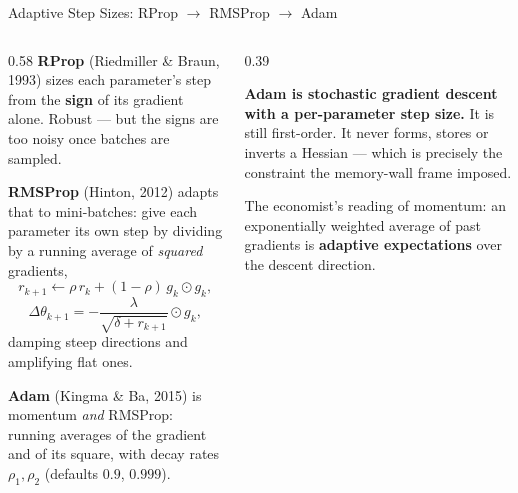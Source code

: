 \begin{frame}{Adaptive Step Sizes: RProp $\to$ RMSProp $\to$ Adam}
\begin{columns}[T]
\begin{column}{0.58\textwidth}
\small
\textbf{RProp} (Riedmiller \& Braun, 1993) sizes each parameter's step from the \textbf{sign} of its gradient alone. Robust --- but the signs are too noisy once batches are sampled.
\medskip

\textbf{RMSProp} (Hinton, 2012) adapts that to mini-batches: give each parameter its own step by dividing by a running average of \emph{squared} gradients,
\[
  r_{k+1}\leftarrow\rho\,r_k+(1-\rho)\,g_k\odot g_k,
\]
\[
  \Delta\theta_{k+1}=-\frac{\lambda}{\sqrt{\delta+r_{k+1}}}\odot g_k ,
\]
damping steep directions and amplifying flat ones.
\medskip

\textbf{Adam} (Kingma \& Ba, 2015) is momentum \emph{and} RMSProp: running averages of the gradient and of its square, with decay rates $\rho_1,\rho_2$ (defaults $0.9$, $0.999$).
\end{column}
\begin{column}{0.39\textwidth}
\begin{takeawaybox}[title=\textbf{What Adam is, in one line}]\small
\textbf{Adam is stochastic gradient descent with a per-parameter step size.}
\medskip
It is still first-order. It never forms, stores or inverts a Hessian --- which is precisely the constraint the memory-wall frame imposed.
\end{takeawaybox}
\medskip
\begin{examplebox}\footnotesize
The economist's reading of momentum: an exponentially weighted average of past gradients is \textbf{adaptive expectations} over the descent direction.
\end{examplebox}
\end{column}
\end{columns}
\vspace{1mm}
\end{frame}

